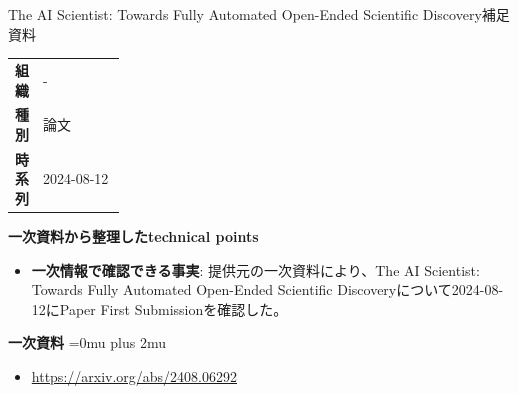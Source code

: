 \begin{technicalnote}{The AI Scientist: Towards Fully Automated Open-Ended Scientific Discovery}{補足資料}
\begingroup
\begin{tabularx}{\linewidth}{@{}>{\bfseries}p{0.22\linewidth}X@{}}
組織 & - \\
種別 & 論文 \\
時系列 & 2024-08-12 \\
\end{tabularx}
\smallskip
{\bfseries 一次資料から整理したtechnical points}
\begin{itemize}[leftmargin=1.5em,itemsep=0.35em]
\item \textbf{一次情報で確認できる事実}: 提供元の一次資料により、The AI Scientist: Towards Fully Automated Open-Ended Scientific Discoveryについて2024-08-12にPaper First Submissionを確認した。
\end{itemize}
\begin{minipage}{\linewidth}
\begin{samepage}
{\bfseries 一次資料}
\begingroup\sloppy
\Urlmuskip=0mu plus 2mu\relax
\begin{itemize}[leftmargin=1.5em,itemsep=0.25em]
\item {\scriptsize\url{https://arxiv.org/abs/2408.06292}}
\end{itemize}
\endgroup
\end{samepage}
\end{minipage}
\endgroup
\end{technicalnote}
\medskip
